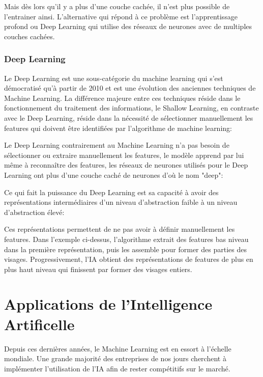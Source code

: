             Mais dès lors qu'il y a plus d'une couche cachée,
            il n'est plus possible de l'entrainer ainsi.
            L'alternative qui répond à ce problème est l'apprentissage profond ou
            Deep Learning qui utilise des réseaux de neurones avec de multiples couches
            cachées.


        \subsection{Deep Learning}
            Le Deep Learning est une sous-catégorie du machine learning qui s'est démocratisé
            qu'à partir de 2010 et est une évolution des anciennes techniques de Machine Learning.
            La différence majeure entre ces techniques réside dans le fonctionnement du traitement des
            informations, le Shallow Learning, en contraste avec le Deep
            Learning, réside dans la nécessité de sélectionner manuellement les features
            qui doivent être identifiées par l'algorithme de machine learning:


            Le Deep Learning contrairement au Machine Learning n'a pas besoin de sélectionner
            ou extraire manuellement les features, le modèle apprend par lui même à reconnaître
            des features, les réseaux de neurones utilisés pour le Deep Learning
            ont plus d'une couche caché de neurones d'où le nom "deep": \newline


            Ce qui fait la puissance du Deep Learning est sa capacité à avoir des représentations
            intermédiaires d'un niveau d'abstraction faible à un niveau d'abstraction élevé:



            Ces représentations permettent de ne pas avoir à définir manuellement les features.
            Dans l'exemple ci-dessus, l'algorithme extrait des features bas niveau dans la
            première représentation, puis les assemble pour former des parties des
            visages. Progressivement, l'IA obtient des représentations de features de plus en plus
            haut niveau qui finissent par former des visages entiers. \newline

\chapter{Applications de l'Intelligence Artificelle}
    Depuis ces dernières années, le Machine Learning est en essort à l'échelle mondiale.
    Une grande majorité des entreprises de nos jours cherchent à implémenter l'utilisation de l'IA
    afin de rester compétitifs sur le marché. \newline


